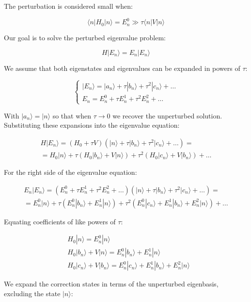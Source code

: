 \documentclass[italian]{HKNdocument}
\begin{document}
The perturbation is considered small when:

\begin{equation}
\langle n|H_0|n\rangle=E_n^0 \gg \tau\langle n|V|n\rangle
\end{equation}

Our goal is to solve the perturbed eigenvalue problem:

\begin{equation}
H|E_n\rangle=E_n|E_n\rangle
\end{equation}

We assume that both eigenstates and eigenvalues can be expanded in powers of $\tau$:

\[
\left\{\begin{array}{l}
|E_n\rangle=|a_n\rangle+\tau|b_n\rangle+\tau^2|c_n\rangle+\ldots \\
E_n=E_n^0+\tau E_n^1+\tau^2 E_n^2+\ldots
\end{array}\right.
\]

With $|a_n\rangle=|n\rangle$ so that when $\tau\rightarrow 0$ we recover the unperturbed solution. Substituting these expansions into the eigenvalue equation:

\[
\begin{array}{r}
H|E_n\rangle=(H_0+\tau V)(|n\rangle+\tau|b_n\rangle+\tau^2|c_n\rangle+\ldots)=\\
=H_0|n\rangle+\tau(H_0|b_n\rangle+V|n\rangle)+\tau^2(H_0|c_n\rangle+V|b_n\rangle)+\ldots
\end{array}
\]

For the right side of the eigenvalue equation:

\begin{gather}
E_n|E_n\rangle=(E_n^0+\tau E_n^1+\tau^2 E_n^2+\ldots)(|n\rangle+\tau|b_n\rangle+\tau^2|c_n\rangle+\ldots)=\\
=E_n^0|n\rangle+\tau(E_n^0|b_n\rangle+E_n^1|n\rangle)+\tau^2(E_n^0|c_n\rangle+E_n^1|b_n\rangle+E_n^2|n\rangle)+\ldots
\end{gather}

Equating coefficients of like powers of $\tau$:

\begin{align}
&H_0|n\rangle=E_n^0|n\rangle\\
&H_0|b_n\rangle+V|n\rangle=E_n^0|b_n\rangle+E_n^1|n\rangle \\
&H_0|c_n\rangle+V|b_n\rangle=E_n^0|c_n\rangle+E_n^1|b_n\rangle+E_n^2|n\rangle
\end{align}

We expand the correction states in terms of the unperturbed eigenbasis, excluding the state $|n\rangle$:
\end{document}
